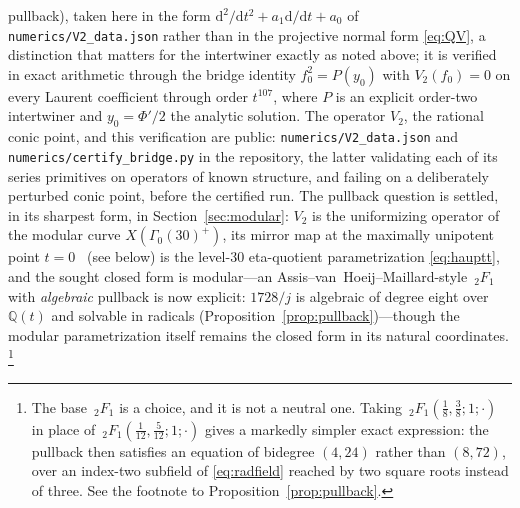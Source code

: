 \documentclass[11pt]{article}
\newcommand{\rmd}{\mathrm{d}}
\theoremstyle{plain}
\theoremstyle{remark}
\begin{document}
pullback), taken here in the form $\rmd^2/\rmd t^2+a_1\rmd/\rmd t+a_0$ of \texttt{numerics/V2\_data.json}
rather than in the projective normal form \eqref{eq:QV}, a distinction that matters for the intertwiner
exactly as noted above; it is verified in exact arithmetic through the bridge identity $f_0^2=P(y_0)$ with $V_2(f_0)=0$ on every
Laurent coefficient through order $t^{107}$, where $P$ is an explicit order-two intertwiner and $y_0=\Phi'/2$ the
analytic solution. The operator $V_2$, the rational conic point, and this verification are public:
\texttt{numerics/V2\_data.json} and \texttt{numerics/certify\_bridge.py} in the repository, the latter validating
each of its series primitives on operators of known structure, and failing on a deliberately perturbed conic
point, before the certified run.
The pullback question is settled, in its sharpest form, in Section~\ref{sec:modular}: $V_2$ is the uniformizing
operator of the modular curve $X(\Gamma_0(30)^+)$, its mirror map at the maximally unipotent point
$t=0$~\cite{Morrison1993} (see below) is the level-30
eta-quotient parametrization \eqref{eq:hauptt}, and the sought closed form is modular---an
Assis--van~Hoeij--Maillard-style $\,_2F_1$ with \emph{algebraic} pullback is now explicit: $1728/j$ is
algebraic of degree eight over $\mathbb{Q}(t)$ and solvable in radicals
(Proposition~\ref{prop:pullback})---though the modular parametrization itself remains the closed form in its natural
coordinates.%
\footnote{The base $\,_2F_1$ is a choice, and it is not a neutral one. Taking
$\,_2F_1\!\left(\tfrac18,\tfrac38;1;\cdot\right)$ in place of
$\,_2F_1\!\left(\tfrac1{12},\tfrac5{12};1;\cdot\right)$ gives a markedly simpler exact expression: the
pullback then satisfies an equation of bidegree $(4,24)$ rather than $(8,72)$, over an index-two subfield
of \eqref{eq:radfield} reached by two square roots instead of three. See the footnote to
Proposition~\ref{prop:pullback}.}
\end{document}
